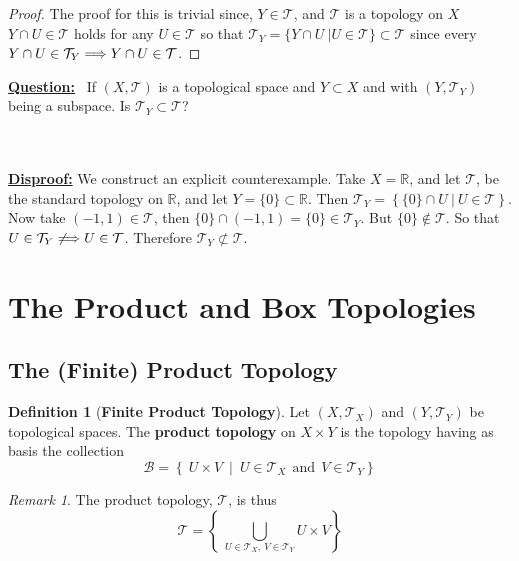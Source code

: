 \documentclass{article}
\theoremstyle{remark}
\newtheorem*{remark}{Remark}
\theoremstyle{definition}
\newtheorem{definition}{Definition}[section]
\newcommand{\simplies}{\DOTSB\Longrightarrow}
\begin{document}
\begin{proof}
The proof for this is trivial since, $Y \in \mathcal{T}$, and $\mathcal{T}$ is a topology on $X$ $Y \cap U \in \mathcal{T}$ holds for any $U \in \mathcal{T}$ so that $\mathcal{T}_Y = \{ Y \cap U \ | U \in \mathcal{T}\} \subset \mathcal{T}$ since every $Y \cap U \in  \mathcal{T}_Y \simplies Y \cap U \in  \mathcal{T}$.
\end{proof}

\smallskip \begin{flushleft}
\textbf{\underline{Question:}} \ If $(X, \mathcal{T})$ is a topological space and $Y \subset X$ and with $(Y, \mathcal{T}_Y)$ being a subspace. Is $\mathcal{T}_Y \subset \mathcal{T}$?
\end{flushleft}
\\ \\
\textbf{\underline{Disproof:}} We construct an explicit counterexample. Take $X = \mathbb{R}$, and let $\mathcal{T}$, be the standard topology on $\mathbb{R}$, and let $Y = \{0\} \subset \mathbb{R}$. Then $\mathcal{T}_Y = \left\{ \{0\} \cap U \ | \ U \in \mathcal{T} \right\}$. Now take $(-1, 1) \in \mathcal{T}$, then $\{0\} \cap (-1, 1) = \{0\} \in \mathcal{T}_Y$. But $\{0\} \not\in \mathcal{T}$. So that $U \in \mathcal{T}_Y \not\simplies U \in \mathcal{T}$. Therefore $\mathcal{T}_Y \not\subset \mathcal{T}.$


\bigskip
\newpage
\section{The Product and Box Topologies}

\bigskip

\subsection{The (Finite) Product Topology}

\bigskip

\begin{definition}[\textbf{Finite Product Topology}]
Let $(X, \mathcal{T}_X)$ and $(Y, \mathcal{T}_Y)$ be topological spaces. The \textbf{product topology} on $X \times Y$ is the topology having as basis the collection $$\mathcal{B} = \left\{ \ U \times V \ \middle| \ U \in \mathcal{T}_X \ \ \text{and} \ \ V \in \mathcal{T}_Y\right\}$$
\end{definition}

\begin{remark}
The product topology, $\mathcal{T}$, is thus $$\mathcal{T} = \left\{ \ \bigcup_{U \in \mathcal{T}_X, \ V \in \mathcal{T}_Y} U \times V \right\}$$
\end{remark}
\end{document}
